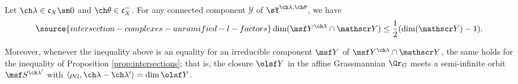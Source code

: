 \begin{prop}
\notready \label{prop:centralstrata}
Let $\ch\lambda \in \mathfrak c_X \sm 0$ and
$\ch\theta \in \mathfrak c_X^-$.
For any connected component $\mathscr Y$ of
$\sY^{\ch\lambda,\ch\theta}$,
we have
\begin{equation} \label{e:semismall-ineq}
\source{intersection-complexes-unramified-l-factors}
    \dim ( \msf Y^{\ch\lambda} \cap \mathscr Y )
    \le \frac 1 2 ( \dim (\mathscr Y) - 1 ).
\end{equation}

Moreover, whenever the inequality above is an equality for an irreducible component $\msf Y$ of $\msf Y^{\ch\lambda} \cap \mathscr Y$, the same holds for the inequality of Proposition \ref{prop:intersections}; that is, the closure $\olsf Y$ in the affine Grassmannian $\Gr_G$ meets a semi-infinite orbit $\msf S^{\ch\lambda'}$ with $\left< \rho_G, \ch\lambda-\ch\lambda'\right> = \dim \olsf Y$.
\end{prop}



